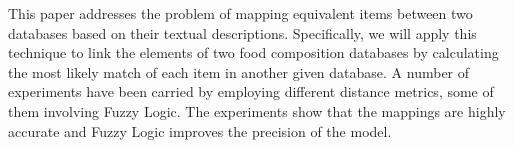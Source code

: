 



This paper addresses the problem of mapping equivalent items between two databases based on their textual descriptions. Specifically, we will apply this technique to link the elements of two food composition databases by calculating the most likely match of each item in another given database. A number of experiments have been carried by employing different distance metrics, some of them involving Fuzzy Logic. The experiments show that the mappings are highly accurate and Fuzzy Logic improves the precision of the model.%



